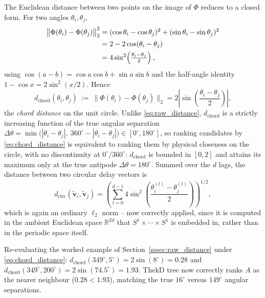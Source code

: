 \documentclass[letterpaper, 10pt, conference]{IEEEtran}
\begin{document}
        The Euclidean distance between two points on the image of $\Phi$
        reduces to a closed form. For two angles $\theta_i,\theta_j$,
        \begin{align}
            \bigl\|\Phi(\theta_i)-\Phi(\theta_j)\bigr\|_2^2
                &= (\cos\theta_i-\cos\theta_j)^2 + (\sin\theta_i-\sin\theta_j)^2 \notag\\
                &= 2 - 2\cos(\theta_i-\theta_j) \notag\\
                &= 4\sin^2\!\left(\tfrac{\theta_i-\theta_j}{2}\right),
            \label{eq:chord_derivation}
        \end{align}
        using $\cos(a-b)=\cos a\cos b+\sin a\sin b$ and the half-angle
        identity $1-\cos x = 2\sin^2(x/2)$. Hence
        \begin{equation}
            d_{\mathrm{chord}}(\theta_i,\theta_j)\ :=\ \bigl\|\Phi(\theta_i)-\Phi(\theta_j)\bigr\|_2
                = 2\left|\sin\!\left(\frac{\theta_i-\theta_j}{2}\right)\right|,
            \label{eq:chord_distance}
        \end{equation}
        the \emph{chord distance} on the unit circle. Unlike
        \eqref{eq:raw_distance}, $d_{\mathrm{chord}}$ is a strictly increasing
        function of the true angular separation
        $\Delta\theta = \min\bigl(|\theta_i-\theta_j|,\ 360^{\circ}-|\theta_i-\theta_j|\bigr)\in[0^{\circ},180^{\circ}]$,
        so ranking candidates by \eqref{eq:chord_distance} is equivalent to
        ranking them by physical closeness on the circle, with no
        discontinuity at $0^{\circ}/360^{\circ}$: $d_{\mathrm{chord}}$ is bounded
        in $[0,2]$ and attains its maximum only at the true antipode
        $\Delta\theta=180^{\circ}$. Summed over the $d$ lags, the distance
        between two circular delay vectors is
        \begin{equation}
            d_{\mathrm{circ}}(\widetilde{\mathbf{v}}_i,\widetilde{\mathbf{v}}_j)
                = \left(\sum_{l=0}^{d-1} 4\sin^2\!\left(\frac{\theta_i^{(l)}-\theta_j^{(l)}}{2}\right)\right)^{\!1/2},
            \label{eq:circ_distance_full}
        \end{equation}
        which is again an ordinary $\ell_2$ norm -- now correctly applied,
        since it is computed in the ambient Euclidean space $\mathbb{R}^{2d}$
        that $S^1\times\cdots\times S^1$ is embedded in, rather than in the
        periodic space itself.

        Re-evaluating the worked example of
        Section~\ref{sssec:raw_distance} under \eqref{eq:chord_distance}:
        $d_{\mathrm{chord}}(349^{\circ},5^{\circ}) = 2\sin(8^{\circ}) = 0.28$
        and $d_{\mathrm{chord}}(349^{\circ},200^{\circ}) = 2\sin(74.5^{\circ}) = 1.93$.
        ThekD tree now correctly ranks $A$ as the nearer neighbour
        ($0.28 < 1.93$), matching the true $16^{\circ}$ versus $149^{\circ}$
        angular separations.
\end{document}
